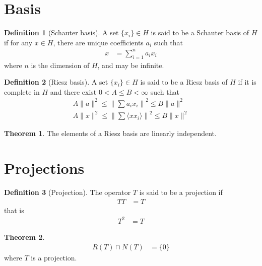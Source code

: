 \documentclass[titlepage, fleqn, a4paper, 12pt, twoside]{article}
\theoremstyle{definition}
\newtheorem{definition}{Definition}
\theoremstyle{theorem}
\newtheorem{theorem}{Theorem}
\begin{document}
\section{Basis}

\begin{definition}[Schauter basis]
	A set $\{x_i\} \in H$ is said to be a Schauter basis of $H$ if for any $x \in H$, there are unique coefficients $a_i$ such that
	\begin{align*}
		x &= \sum\limits_{i = 1}^{n} a_i x_i
	\end{align*}
	where $n$ is the dimension of $H$, and may be infinite.
\end{definition}

\begin{definition}[Riesz basis]
	A set $\{x_i\} \in H$ is said to be a Riesz basis of $H$ if it is complete in $H$ and there exist $0 < A \le B < \infty$ such that
	\begin{eqnarray*}
		A \|a\|^2 \le \left\| \sum a_i x_i \right\|^2 \le B \|a\|^2\\
		A \|x\|^2 \le \left\| \sum \langle x x_i \rangle \right\|^2 \le B \|x\|^2
	\end{eqnarray*}
\end{definition}

\begin{theorem}
	The elements of a Riesz basis are linearly independent.
\end{theorem}

\section{Projections}

\begin{definition}[Projection]
	The operator $T$ is said to be a projection if
	\begin{align*}
		T T &= T
	\end{align*}
	that is
	\begin{align*}
		T^2 &= T
	\end{align*}
\end{definition}

\begin{theorem}
	\begin{align*}
		R(T) \cap N(T) &= \{0\}
	\end{align*}
	where $T$ is a projection.
\end{theorem}
\end{document}
